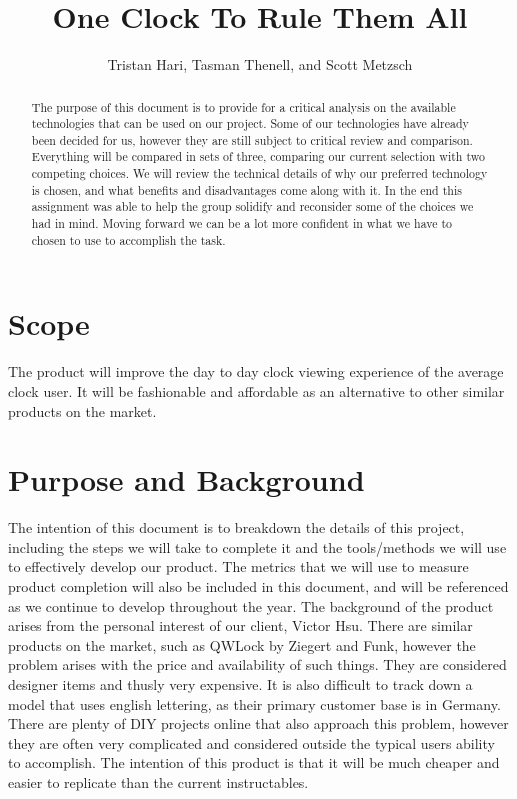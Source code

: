 \documentclass[10pt,draftclsnofoot,onecolumn]{IEEEtran}
\begin{document}
\title{One Clock To Rule Them All}
\author{Tristan Hari, Tasman Thenell, and Scott Metzsch}
\maketitle
\begin{abstract}
The purpose of this document is to provide for a critical analysis on the available technologies that can be used on our project.
Some of our technologies have already been decided for us, however they are still subject to critical review and comparison.
Everything will be compared in sets of three, comparing our current selection with two competing choices.
We will review the technical details of why our preferred technology is chosen, and what benefits and disadvantages come along with it.
In the end this assignment was able to help the group solidify and reconsider some of the choices we had in mind.
Moving forward we can be a lot more confident in what we have to chosen to use to accomplish the task.
\end{abstract}

\newpage

\section{Scope}
The product will improve the day to day clock viewing experience of the average clock user.
It will be fashionable and affordable as an alternative to other similar products on the market.

\section{Purpose and Background}
The intention of this document is to breakdown the details of this project, including the steps we will take to complete it and the tools/methods we will use to effectively develop our product.
The metrics that we will use to measure product completion will also be included in this document, and will be referenced as we continue to develop throughout the year.
The background of the product arises from the personal interest of our client, Victor Hsu.
There are similar products on the market, such as QWLock by Ziegert and Funk, however the problem arises with the price and availability of such things.
They are considered designer items and thusly very expensive.
It is also difficult to track down a model that uses english lettering, as their primary customer base is in Germany.
There are plenty of DIY projects online that also approach this problem, however they are often very complicated and considered outside the typical users ability to accomplish.
The intention of this product is that it will be much cheaper and easier to replicate than the current instructables.
\end{document}
